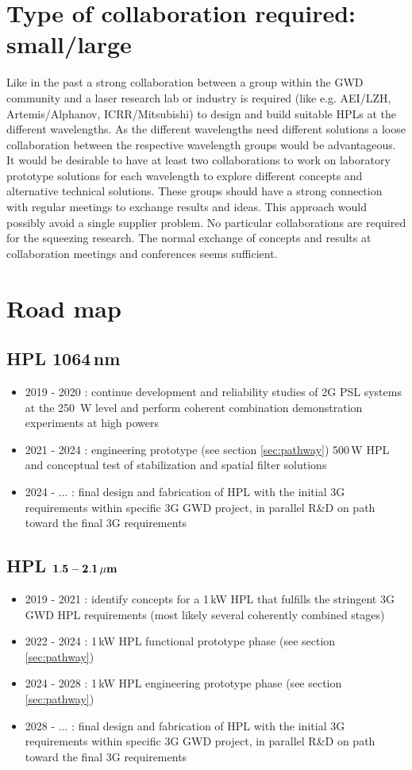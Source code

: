\section{Type of collaboration required:  small/large}
Like in the past a strong collaboration between a group within the GWD community and a laser research lab or industry is required (like e.g.  AEI/LZH, Artemis/Alphanov, ICRR/Mitsubishi) to design and build suitable HPLs at the different wavelengths. As the different wavelengths need different solutions a loose collaboration between the respective wavelength groups would be advantageous. It would be desirable to have at least two collaborations to work on laboratory prototype solutions for each wavelength to explore different concepts and alternative technical solutions. These groups should have a strong connection with regular meetings to exchange results and ideas. This approach would possibly avoid a single supplier problem.
No particular collaborations are required for the squeezing research. The normal exchange of concepts and results at collaboration meetings and conferences seems sufficient. 

\section{Road map}
\subsection*{HPL 1064\,nm}
\begin{itemize}
	\item 2019 - 2020 : continue development and reliability studies of 2G PSL systems at the 250\, W level and perform coherent combination demonstration experiments at high powers
	\item 2021 - 2024 : engineering prototype (see section \ref{sec:pathway}) 500\,W HPL and conceptual test of stabilization and spatial filter solutions
	\item 2024 - ... : final design and fabrication of HPL with the initial 3G requirements within specific 3G GWD project, in parallel R\&D on path toward the final 3G requirements 
\end{itemize} 


\subsection*{HPL ${\bf 1.5 - 2.1 \, {\bf \mu m}}$}
\begin{itemize}
	\item 2019 - 2021 : identify concepts for a 1\,kW HPL that fulfills the stringent 3G GWD HPL requirements (most likely several coherently combined stages)
	\item 2022 - 2024 : 1\,kW HPL functional prototype phase (see section \ref{sec:pathway})
	\item 2024 - 2028 : 1\,kW HPL engineering prototype phase (see section \ref{sec:pathway})
	\item 2028 - ... : final design and fabrication of HPL with the initial 3G requirements within specific 3G GWD project, in parallel R\&D on path toward the final 3G requirements
\end{itemize} 


